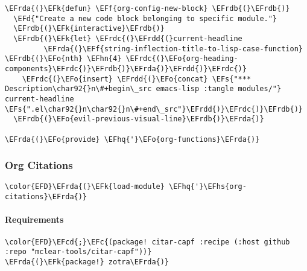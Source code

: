 \documentclass[a4wide,10pt]{article}
\newcommand{\EFc}[1]{\textcolor{EFc}{#1}} %
\newcommand{\EFcd}[1]{\textcolor{EFcd}{#1}} %
\newcommand{\EFs}[1]{\textcolor{EFs}{#1}} %
\newcommand{\EFd}[1]{\textcolor{EFd}{#1}} %
\newcommand{\EFk}[1]{\textcolor{EFk}{#1}} %
\newcommand{\EFf}[1]{\textcolor{EFf}{#1}} %
\newcommand{\EFo}[1]{\textcolor{EFo}{#1}} %
\newcommand{\EFhn}[1]{\textcolor{EFhn}{\textbf{#1}}} %
\newcommand{\EFhq}[1]{\textcolor{EFhq}{#1}} %
\newcommand{\EFhs}[1]{\textcolor{EFhs}{#1}} %
\newcommand{\EFrda}[1]{\textcolor{EFrda}{#1}} %
\newcommand{\EFrdb}[1]{\textcolor{EFrdb}{#1}} %
\newcommand{\EFrdc}[1]{\textcolor{EFrdc}{#1}} %
\newcommand{\EFrdd}[1]{\textcolor{EFrdd}{#1}} %
\begin{document}
\begin{Code}
\begin{Verbatim}
\EFrda{(}\EFk{defun} \EFf{org-config-new-block} \EFrdb{(}\EFrdb{)}
  \EFd{"Create a new code block belonging to specific module."}
  \EFrdb{(}\EFk{interactive}\EFrdb{)}
  \EFrdb{(}\EFk{let} \EFrdc{(}\EFrdd{(}current-headline
         \EFrda{(}\EFf{string-inflection-title-to-lisp-case-function} \EFrdb{(}\EFo{nth} \EFhn{4} \EFrdc{(}\EFo{org-heading-components}\EFrdc{)}\EFrdb{)}\EFrda{)}\EFrdd{)}\EFrdc{)}
    \EFrdc{(}\EFo{insert} \EFrdd{(}\EFo{concat} \EFs{"*** Description\char92{}n\#+begin\_src emacs-lisp :tangle modules/"} current-headline \EFs{".el\char92{}n\char92{}n\#+end\_src"}\EFrdd{)}\EFrdc{)}\EFrdb{)}
  \EFrdb{(}\EFo{evil-previous-visual-line}\EFrdb{)}\EFrda{)}

\EFrda{(}\EFo{provide} \EFhq{'}\EFo{org-functions}\EFrda{)}
\end{Verbatim}
\end{Code}
\subsubsection{Org Citations}
\label{sec:org18bde93}
\begin{Code}
\begin{Verbatim}
\color{EFD}\EFrda{(}\EFk{load-module} \EFhq{'}\EFhs{org-citations}\EFrda{)}
\end{Verbatim}
\end{Code}
\paragraph{Requirements}
\label{sec:orgd1d0795}
\begin{Code}
\begin{Verbatim}
\color{EFD}\EFcd{;}\EFc{(package! citar-capf :recipe (:host github :repo "mclear-tools/citar-capf"))}
\EFrda{(}\EFk{package!} zotra\EFrda{)}
\end{Verbatim}
\end{Code}
\end{document}
